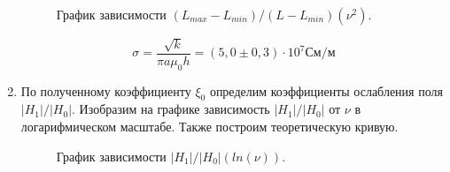 \documentclass[a4paper, 12pt]{article}%
\begin{document}
\begin{enumerate}
	\begin{figure}[H]
		\caption{График зависимости $(L_{max} - L_{min})/(L - L_{min})(\nu^2)$.}
	\end{figure}

	$$ \sigma = \frac{\sqrt{k}}{\pi a \mu_0 h} = (5,0 \pm 0,3)\cdot 10^7 \text{См/м} $$
	
	\newpage
	
	\item По полученному коэффициенту $\xi_0$ определим коэффициенты ослабления поля $ |H_1|/|H_0|$. Изобразим на графике зависимость $ |H_1|/|H_0|$ от  $\nu$ в логарифмическом масштабе. Также построим теоретическую кривую.
	
	\begin{figure}[H]
		\caption{График зависимости $|H_1|/|H_0|(ln(\nu))$.}
	\end{figure}
	
	
		
	\end{enumerate}
	
\end{document}
